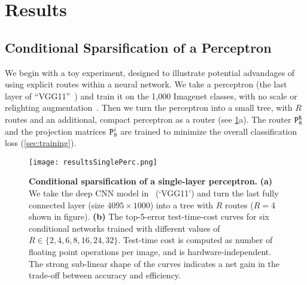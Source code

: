 \documentclass[thesis]{subfiles}
\begin{document}
	
	\section[Results]{Results}

	\subsection{Conditional Sparsification of a Perceptron}\label{sec:results_perceptron}
	We begin with a toy experiment, designed to illustrate potential advandages of using explicit routes within a neural network. We take a perceptron (the last layer of ``VGG11''~\cite{Simonyan2014verydeep}) and
	train it on the 1,000 Imagenet classes, with no scale or relighting augmentation~\cite{Jia2014}.
	Then we turn the perceptron into a small tree, with $R$ routes and an additional, compact perceptron as a router (see \cref{fig:resultsSinglePerc}a). The router ${\mat P}^{\tt R}_8$ and the projection matrices ${\mat P}^i_8$ are trained to minimize the overall classification loss (\cref{sec:training}).

	\begin{figure}[tbp]
	\centerline{
	\texttt{[image: resultsSinglePerc.png]}
	}
	\caption[Conditional sparsification of a single-layer perceptron]{{\bf Conditional sparsification of a single-layer perceptron.}
	{\bf (a)}  We take the deep CNN model in~\cite{Simonyan2014verydeep} (`VGG11') and turn the last fully connected layer (size $4095\times1000$) into a tree with $R$ routes ($R=4$ shown in figure).
	{\bf (b)} The top-5-error \vs test-time-cost curves for six conditional networks trained with different values of $R\in\{2,4,6,8,16,24,32\}$. 
	Test-time cost is computed as number of floating point operations per image, and is hardware-independent.
	The strong sub-linear shape of the curves indicates a net gain in the trade-off between accuracy and efficiency. 
	}
	\label{fig:resultsSinglePerc}
	\end{figure}
\end{document}
